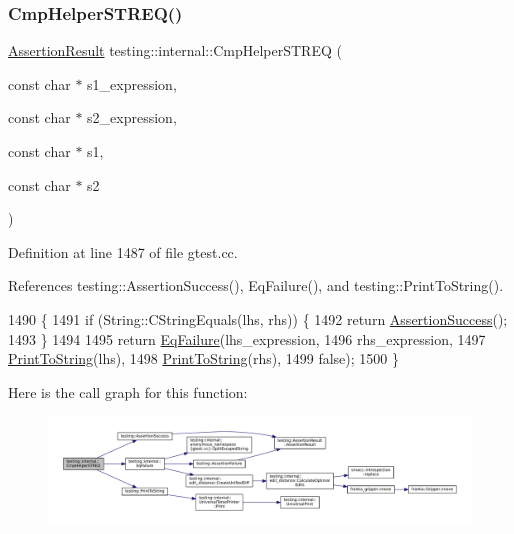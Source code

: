\subsubsection{\texorpdfstring{Cmp\+Helper\+S\+T\+R\+E\+Q()}{CmpHelperSTREQ()}\hspace{0.1cm}{\footnotesize\ttfamily [1/2]}}
{\footnotesize\ttfamily \hyperlink{classtesting_1_1AssertionResult}{Assertion\+Result} testing\+::internal\+::\+Cmp\+Helper\+S\+T\+R\+EQ (\begin{DoxyParamCaption}\item[{const char $\ast$}]{s1\+\_\+expression,  }\item[{const char $\ast$}]{s2\+\_\+expression,  }\item[{const char $\ast$}]{s1,  }\item[{const char $\ast$}]{s2 }\end{DoxyParamCaption})}



Definition at line 1487 of file gtest.\+cc.



References testing\+::\+Assertion\+Success(), Eq\+Failure(), and testing\+::\+Print\+To\+String().


\begin{DoxyCode}
1490                                                 \{
1491   \textcolor{keywordflow}{if} (String::CStringEquals(lhs, rhs)) \{
1492     \textcolor{keywordflow}{return} \hyperlink{namespacetesting_ac1d0baedb17286c5c6c87bd1a45da8ac}{AssertionSuccess}();
1493   \}
1494 
1495   \textcolor{keywordflow}{return} \hyperlink{namespacetesting_1_1internal_a08725846ff184d3e79bcf5be4df19157}{EqFailure}(lhs\_expression,
1496                    rhs\_expression,
1497                    \hyperlink{namespacetesting_aa5717bb1144edd1d262d310ba70c82ed}{PrintToString}(lhs),
1498                    \hyperlink{namespacetesting_aa5717bb1144edd1d262d310ba70c82ed}{PrintToString}(rhs),
1499                    \textcolor{keyword}{false});
1500 \}
\end{DoxyCode}
Here is the call graph for this function\+:
\nopagebreak
\begin{figure}[H]
\begin{center}
\leavevmode
\includegraphics[width=350pt]{namespacetesting_1_1internal_a711a396ed8f636ecd14a850a89d181b6_cgraph}
\end{center}
\end{figure}
\mbox{\label{namespacetesting_1_1internal_ad351878f87634853c4eb005fe9b169a8}} 
